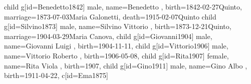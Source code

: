 \documentclass{article}
\begin{document}
\begin{midpage}
\begin{center}
\begin{genealogypicture}
{{{{{{{{                                child{
                                    g[id=Benedetto1842]{
                                        male,
                                        name={Benedetto },
                                        birth={1842-02-27}{Quinto},
                                        marriage={1873-07-03}{Maria Galonetti},
                                        death={1915-02-07}{Quinto}
                                    }
                                    child{
                                        g[id=Silvino1873]{
                                            male,
                                            name={Silvino Vittorio },
                                            birth={1873-12-21}{Quinto},
                                            marriage={1904-03-29}{Maria Canova},
                                        }
                                        child{
                                            g[id=Giovanni1904]{
                                                male,
                                                name={Giovanni Luigi },
                                                birth={1904-11-11}{},
                                            }
                                        }
                                        child{
                                            g[id=Vittorio1906]{
                                                male,
                                                name={Vittorio Roberto },
                                                birth={1906-05-08}{},
                                            }
                                        }
                                        child{
                                            g[id=Rita1907]{
                                                female,
                                                name={Rita Viola },
                                                birth={1907}{},
                                            }
                                        }
                                        child{
                                            g[id=Gino1911]{
                                                male,
                                                name={Gino Albo },
                                                birth={1911-04-22}{},
                                            }
                                        }
                                    }
                                    c[id=Ema1875]{
}}}}}}}}}}
\end{genealogypicture}
\end{center}
\end{midpage}
\end{document}
